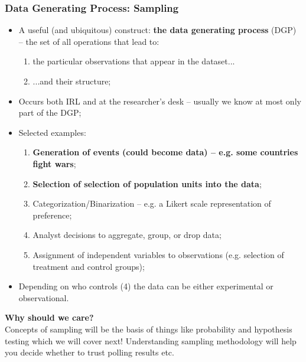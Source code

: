 \documentclass[aspectratio=169]{beamer}
\theoremstyle{principle}
\begin{document}
\begin{frame}
\frametitle{Data Generating Process: Sampling}

\begin{itemize}
\item A useful (and ubiquitous) construct: \textbf{the data generating process} (DGP) -- the set of all operations that lead to:
\begin{enumerate}
\item the particular observations that appear in the dataset...
\item[]\color{gray} ...and their structure;
\end{enumerate}
\bigskip
\item[]\color{gray} Occurs both IRL and at the researcher's desk -- usually we know at most only part of the DGP;
\bigskip
\item Selected examples:
\begin{enumerate}
\item \textbf{Generation of events (could become data) -- e.g. some countries fight wars};
\item \textbf{Selection of selection of population units into the data};
\item[]\color{gray} Categorization/Binarization -- e.g. a Likert scale representation of preference;
\item[]\color{gray} Analyst decisions to aggregate, group, or drop data;
\item[]\color{gray} Assignment of independent variables to observations (e.g. selection of treatment and control groups);
\end{enumerate}
\bigskip
\item[] \color{white}Depending on who controls (4) the data can be either experimental or observational.
\end{itemize}

\end{frame}

\begin{frame}

\begin{center}
\Huge\textbf{Why should we care?}\\
\bigskip
\bigskip
\large Concepts of sampling will be the basis of things like probability and hypothesis testing which we will cover next!  Understanding sampling methodology will help you decide whether to trust polling results etc.\\
\end{center}

\end{frame}
\end{document}
